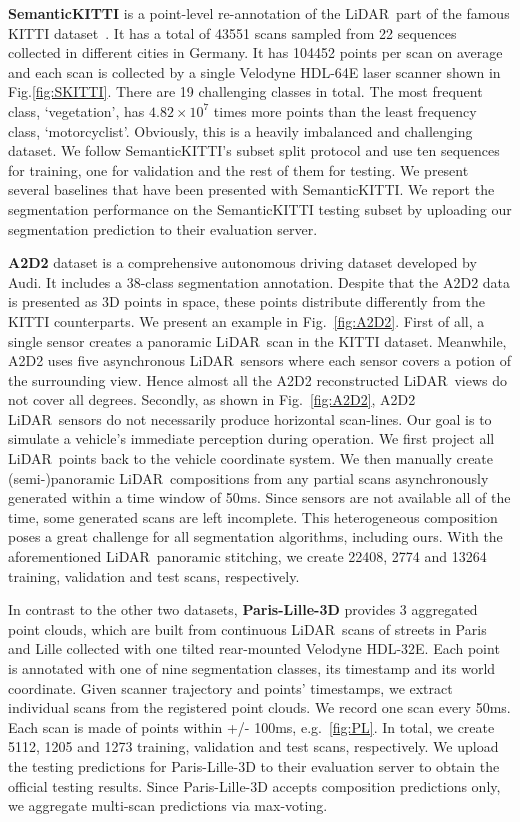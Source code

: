 \documentclass[10pt,twocolumn,letterpaper]{article}
\newcommand{\lidar}{\mbox{LiDAR }}
\begin{document}
\textbf{SemanticKITTI} is a point-level re-annotation of the \lidar part of the famous KITTI dataset~\cite{geiger2012cvpr}. It has a total of 43551 scans sampled from 22 sequences collected in different cities in Germany. It has 104452 points per scan on average and each scan is collected by a single  Velodyne HDL-64E laser scanner shown in Fig.\ref{fig:SKITTI}. There are 19 challenging classes in total. The most frequent class, `vegetation', has $4.82\times10^{7}$ times more points than the least frequency class, `motorcyclist'. Obviously, this is a heavily imbalanced and challenging dataset. We follow SemanticKITTI’s subset split protocol and use ten sequences for training, one for validation and the rest of them for testing. We present several baselines that have been presented with SemanticKITTI.  We report the segmentation performance on the SemanticKITTI testing subset by uploading our segmentation prediction to their evaluation server.

\textbf{A2D2} dataset is a comprehensive autonomous driving dataset developed by Audi. It includes  a 38-class segmentation annotation. Despite that the A2D2 data is presented as 3D points in space, these points distribute differently from the KITTI counterparts. We present an example in Fig.~\ref{fig:A2D2}. First of all, a single  sensor creates a  panoramic \lidar scan in the KITTI dataset. Meanwhile, A2D2 uses five asynchronous \lidar sensors where each sensor covers a potion of the surrounding view. Hence almost all the A2D2 reconstructed \lidar views do not cover all degrees. Secondly, as shown in Fig.~\ref{fig:A2D2}, A2D2 \lidar sensors do not necessarily produce horizontal scan-lines. Our goal is to simulate a vehicle's immediate perception during operation. We first project all \lidar points back to the vehicle coordinate system. We then manually create (semi-)panoramic \lidar compositions from any partial scans asynchronously generated within a time window of 50ms. Since sensors are not available all of the time, some generated scans are left incomplete. This heterogeneous composition poses a great challenge for all segmentation algorithms, including ours.  With the aforementioned \lidar panoramic stitching, we create 22408, 2774 and 13264 training, validation and test scans, respectively.

In contrast to the other two datasets, \textbf{Paris-Lille-3D} provides 3 aggregated point clouds, which are built from continuous \lidar scans of streets in Paris and Lille collected with one tilted rear-mounted Velodyne HDL-32E. Each point is annotated with one of nine segmentation classes, its timestamp and its world coordinate. Given scanner trajectory and points' timestamps, we extract individual scans from the registered point clouds. We record one scan every 50ms. Each scan is made of points within +/- 100ms, e.g.~\ref{fig:PL}. In total, we create 5112, 1205 and 1273 training, validation and test scans, respectively. We upload the testing predictions for Paris-Lille-3D to their evaluation server to obtain the official testing results. Since Paris-Lille-3D accepts composition predictions only, we aggregate multi-scan predictions via max-voting.
\end{document}
